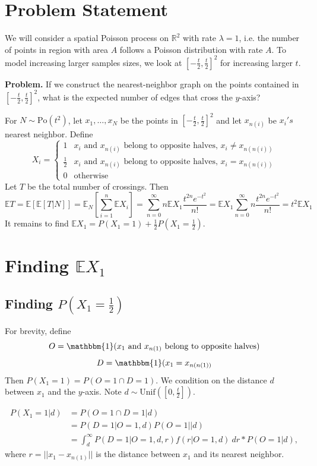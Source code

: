 \documentclass{article}
\begin{document}
\section{Problem Statement}

We will consider a spatial Poisson process on $\mathbb{R}^2$ with rate $\lambda = 1$, i.e. the number of points in region with area $A$ follows a Poisson distribution with rate $A$. To model increasing larger samples sizes, we look at $[-\frac{t}{2}, \frac{t}{2}]^2$ for increasing larger $t$.

\bigbreak\textbf{Problem.} If we construct the nearest-neighbor graph on the points contained in $[-\frac{t}{2}, \frac{t}{2}]^2$, what is the expected number of edges that cross the $y$-axis?

\bigbreak For $N \sim \textrm{Po}(t^2)$, let $x_1, \hdots, x_N$ be the points in $[-\frac{t}{2}, \frac{t}{2}]^2$ and let $x_{n(i)}$ be $x_i's$ nearest neighbor. Define
$$X_i = \begin{cases}
1 & \textrm{$x_i$ and $x_{n(i)}$ belong to opposite halves, $x_i \neq x_{n(n(i))}$} \\
\frac{1}{2} & \textrm{$x_i$ and $x_{n(i)}$ belong to opposite halves, $x_i = x_{n(n(i))}$} \\
0 & \textrm{otherwise}
\end{cases}$$
Let $T$ be the total number of crossings. Then
$$\mathbb{E}T = \mathbb{E}[\mathbb{E}[T|N]] = \mathbb{E}_N\left[\sum_{i=1}^n \mathbb{E}{X_i}\right] = \sum_{n=0}^\infty n\mathbb{E}X_1 \frac{t^{2n}e^{-t^2}}{n!} = \mathbb{E}X_1 \sum_{n=0}^\infty n\frac{t^{2n}e^{-t^2}}{n!} = t^2\mathbb{E}X_1$$
It remains to find $\mathbb{E}X_1 = P(X_1 = 1) + \frac{1}{2}P(X_1 = \frac{1}{2})$.

\section{Finding $\mathbb{E}X_1$}

\subsection{Finding $P(X_1 = \frac{1}{2})$}

For brevity, define
$$O = \mathbbm{1}(\textrm{$x_1$ and $x_{n(1)}$ belong to opposite halves})$$
$$D = \mathbbm{1}(x_1 = x_{n(n(1))}$$
Then $P(X_1 = 1) = P(O = 1 \cap D = 1)$. We condition on the distance $d$ between $x_1$ and the $y$-axis. Note $d \sim \textrm{Unif}([0, \frac{t}{2}])$.

\begin{equation}
\begin{split}
P(X_1 = 1|d) &= P(O = 1 \cap D = 1 | d) \\
&= P(D = 1 | O = 1,d) P(O = 1 | | d) \\
&= \int_d^\infty P(D = 1 | O = 1, d, r) f(r | O = 1, d) \:dr * P(O = 1 | d),
\end{split}
\end{equation}
where $r = ||x_1 - x_{n(1)}||$ is the distance between $x_1$ and its nearest neighbor.
\end{document}

